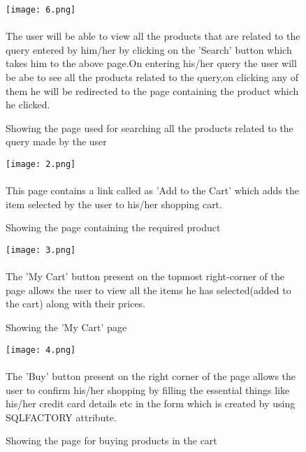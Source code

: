 \documentclass[a4paper]{article}
\begin{document}
\begin{figure}[h!]
\centering
\texttt{[image: 6.png]}
\caption{Showing the page used for searching all the products related to the query made by the user }
\label{fig:Search page}
\paragraph{}
The user will be able to view all the products that are related to the query entered by him/her by clicking on the 'Search' button which takes him to the above page.On entering his/her query the user will be abe to see all the products related to the query,on clicking any of them he will be redirected to the page containing the product which he clicked.  
\end{figure}
\newpage


\begin{figure}[h!]
\centering
\texttt{[image: 2.png]}
\caption{Showing the page containing the required product}
\label{fig:The product's page}
\paragraph{}
This page contains a link called as 'Add to the Cart' which adds the item selected by the user to his/her shopping cart.
\end{figure}
\newpage
\begin{figure}[h!]
\centering
\texttt{[image: 3.png]}
\caption{Showing the 'My Cart' page}
\label{fig:'My Cart' page}
\paragraph{}
The 'My Cart' button present on the topmost right-corner of the page allows the user to view all the items he has selected(added to the cart) along with their prices.
\end{figure}
\newpage
\begin{figure}[h!]
\centering
\texttt{[image: 4.png]}
\caption{Showing the page for buying products in the cart}
\label{fig:A page to buy things}
\paragraph{}
The 'Buy' button  present on the right corner of the page allows the user to confirm his/her shopping by filling the essential things like his/her credit card details etc in the form which is created by using SQLFACTORY attribute.
\end{figure}
\newpage
\end{document}
